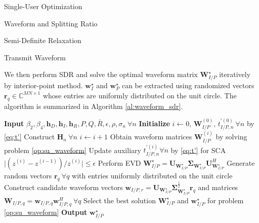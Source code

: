 \documentclass{IEEEtran}
\begin{document}
\begin{section}{Single-User Optimization}
\begin{subsection}{Waveform and Splitting Ratio}
\begin{subsubsection}{Semi-Definite Relaxation}
\begin{paragraph}{Transmit Waveform}
\begin{maxi!}
				\end{maxi!}
				We then perform SDR and solve the optimal waveform matrix $\boldsymbol{W}_{I/P}^{\star}$ iteratively by interior-point method. $\boldsymbol{w}_I^{\star}$ and $\boldsymbol{w}_P^{\star}$ can be extracted using randomized vectors $\boldsymbol{r}_q \in \mathbb{C}^{MN \times 1}$ whose entries are uniformly distributed on the unit circle. The algorithm is summarized in Algorithm \ref{al:waveform_sdr}.
				\begin{algorithm}
					\caption{SDR: Transmit Waveform}
					\label{al:waveform_sdr}
					\begin{algorithmic}[1]
						\State \textbf{Input} $\beta_2,\beta_4,\boldsymbol{h}_D,\boldsymbol{h}_I,\boldsymbol{h}_R,P,Q,\bar{R},\epsilon,\rho,\sigma_n \ \forall n$
						\State \textbf{Initialize} $i \gets 0$, $\boldsymbol{W}_{I/P}^{(0)}$, $t_{I/P,n}^{\prime (0)} \ \forall n$ by \ref{eq:t'}
						\State Construct $\boldsymbol{H}_n \ \forall n$
						\Repeat
						\State $i \gets i + 1$
						\State Obtain waveform matrices $\boldsymbol{W}_{I/P}^{(i)}$ by solving problem \ref{op:su_waveform}
						\State Update auxiliary $t_{I/P,n}^{\prime (i)} \forall n$ by \ref{eq:t'} for SCA
						\Until $\lvert (z^{(i)}-z^{(i-1)}) / z^{(i)} \rvert \le \epsilon$
						\State Perform EVD $\boldsymbol{W}_{I/P}^{\star}=\boldsymbol{U}_{\boldsymbol{W}_{I/P}^{\star}}\boldsymbol{\Sigma}_{\boldsymbol{W}_{I/P}^{\star}}\boldsymbol{U}_{\boldsymbol{W}_{I/P}^{\star}}^H$
						\State Generate random vectors $\boldsymbol{r}_q \ \forall q$ with entries uniformly distributed on the unit circle
						\State Construct candidate waveform vectors $\boldsymbol{w}_{I/P,r}=\boldsymbol{U}_{\boldsymbol{W}_{I/P}^{\star}}\boldsymbol{\Sigma}_{\boldsymbol{W}_{I/P}^{\star}}^{\frac{1}{2}}\boldsymbol{r}_q$ and matrices $\boldsymbol{W}_{I/P,q}=\boldsymbol{w}_{I/P,q}\boldsymbol{w}_{I/P,q}^H  \ \forall q$
						\State Select the best solution $\boldsymbol{W}_{I/P}^\star$ and $\boldsymbol{w}_{I/P}^\star$ for problem \ref{op:su_waveform}
						\State \textbf{Output} $\boldsymbol{w}_{I/P}^\star$
					\end{algorithmic}
				\end{algorithm}
			\end{paragraph}


\end{subsubsection}
\end{subsection}
\end{section}
\end{document}
